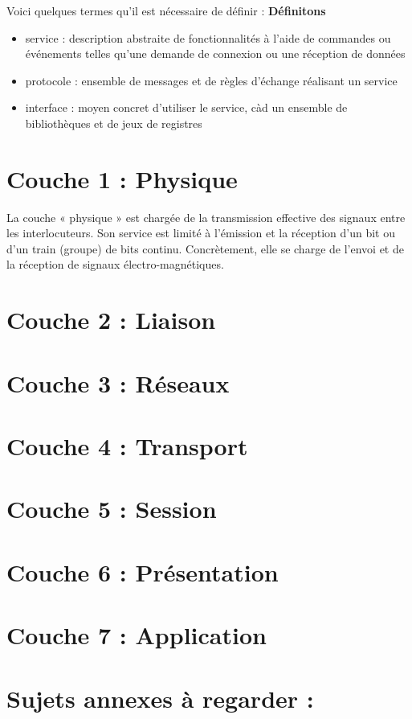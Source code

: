 \documentclass{article}
\begin{document}
Voici quelques termes qu'il est nécessaire de définir :
\textbf{Définitons}
\begin{itemize}
    \item service : description abstraite de fonctionnalités à l'aide de commandes ou événements telles qu'une demande de connexion ou une réception de données
    \item protocole : ensemble de messages et de règles d'échange réalisant un service
    \item interface : moyen concret d'utiliser le service, càd un ensemble de bibliothèques et de jeux de registres
\end{itemize}

\section{Couche 1 : Physique}
La couche « physique » est chargée de la transmission effective des signaux entre les interlocuteurs. Son service est limité à l'émission et la réception d'un bit ou d'un train (groupe) de bits continu. Concrètement, elle se charge de l'envoi et de la réception de signaux électro-magnétiques.
\section{Couche 2 : Liaison}
\section{Couche 3 : Réseaux}
\section{Couche 4 : Transport}
\section{Couche 5 : Session}
\section{Couche 6 : Présentation}
\section{Couche 7 : Application}


\section{Sujets annexes à regarder :}
\end{document}
